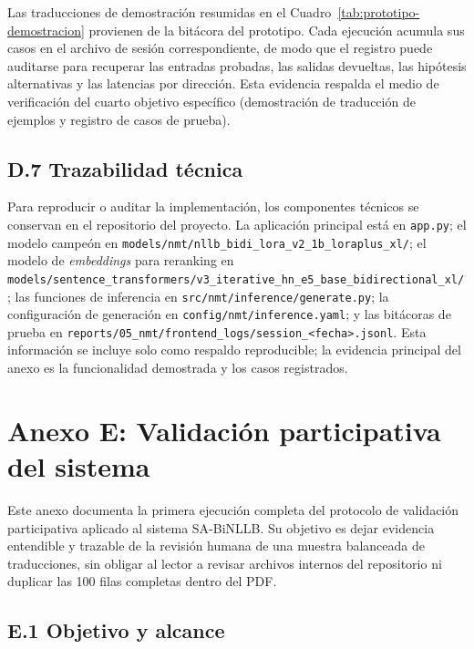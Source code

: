 \documentclass[12pt,a4paper,oneside]{book}
\newcommand{\filepath}[1]{\nolinkurl{#1}}
\begin{document}
Las traducciones de demostración resumidas en el Cuadro~\ref{tab:prototipo-demostracion} provienen de la bitácora del prototipo. Cada ejecución acumula sus casos en el archivo de sesión correspondiente, de modo que el registro puede auditarse para recuperar las entradas probadas, las salidas devueltas, las hipótesis alternativas y las latencias por dirección. Esta evidencia respalda el medio de verificación del cuarto objetivo específico (demostración de traducción de ejemplos y registro de casos de prueba).

\subsection*{D.7 Trazabilidad técnica}

Para reproducir o auditar la implementación, los componentes técnicos se conservan en el repositorio del proyecto. La aplicación principal está en \filepath{app.py}; el modelo campeón en \filepath{models/nmt/nllb\_bidi\_lora\_v2\_1b\_loraplus\_xl/}; el modelo de \emph{embeddings} para reranking en \filepath{models/sentence\_transformers/v3\_iterative\_hn\_e5\_base\_bidirectional\_xl/}; las funciones de inferencia en \filepath{src/nmt/inference/generate.py}; la configuración de generación en \filepath{config/nmt/inference.yaml}; y las bitácoras de prueba en \filepath{reports/05\_nmt/frontend\_logs/session\_<fecha>.jsonl}. Esta información se incluye solo como respaldo reproducible; la evidencia principal del anexo es la funcionalidad demostrada y los casos registrados.

\clearpage
{}
\section*{Anexo E: Validación participativa del sistema}\label{anexo-validacion-participativa}

Este anexo documenta la primera ejecución completa del protocolo de validación participativa aplicado al sistema SA-BiNLLB. Su objetivo es dejar evidencia entendible y trazable de la revisión humana de una muestra balanceada de traducciones, sin obligar al lector a revisar archivos internos del repositorio ni duplicar las 100 filas completas dentro del PDF.

\subsection*{E.1 Objetivo y alcance}
\end{document}
